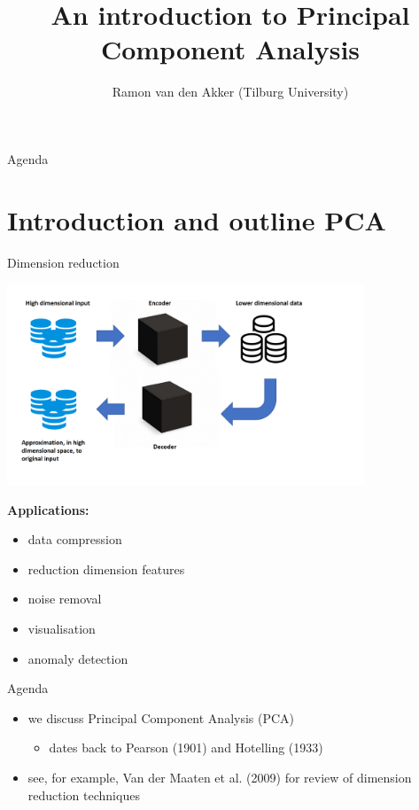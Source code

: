 \documentclass[pdf, handout]{beamer}
\title{An introduction to Principal Component Analysis}
\subtitle{}
\author{Ramon van den Akker (Tilburg University)}
\date{}
\begin{document}
\begin{frame}
\titlepage
\end{frame}

\begin{frame}{Agenda}
\tableofcontents
\end{frame}

%
\section{Introduction and outline PCA}

\begin{frame}{Dimension reduction}
\begin{center}
\includegraphics[width=0.8\textwidth]{plaatje_autoencoder}
\end{center}
\textbf{Applications:}
\begin{itemize}
\item data compression 
\item  reduction dimension features  
\item noise removal
\item visualisation
\item anomaly detection
\end{itemize}
\end{frame}



\begin{frame}{Agenda}
\begin{itemize}
\item we discuss Principal Component Analysis (PCA)
\begin{itemize}
\item dates back to  Pearson  (1901) and Hotelling (1933)
\end{itemize}
\item see, for example, Van der Maaten et al. (2009) for review of dimension reduction techniques
\end{itemize}
\end{frame}
\end{document}
